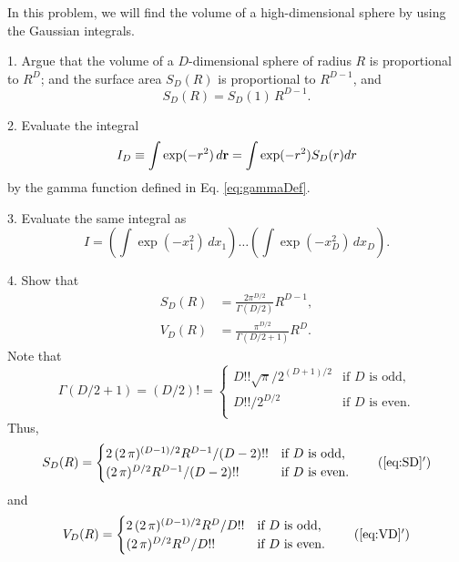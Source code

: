 \documentclass[12pt]{book}
\begin{document}



In this problem, we will find the volume of a high-dimensional sphere
by using the Gaussian integrals.

1. Argue that the volume of a $D$-dimensional sphere of radius $R$ is proportional to
$R^D$; and the surface area $S_D(R)$ is proportional to $R^{D-1}$, and
\[
  S_D(R) = S_D(1) \, R^{D-1}.
\]

2. Evaluate the integral
\[
  I_D \equiv \int \exp(-r^2) \, d\boldsymbol{\mathbf{r}} = \int \exp(-r^2) S_D(r) dr
\]
by the gamma function defined in Eq. \eqref{eq:gammaDef}.

3. Evaluate the same integral as
\[
  I
  =
\left( \int \exp(-x_1^2) \, d x_1 \right)
\dots
\left( \int \exp(-x_D^2) \, d x_D \right).
\]

4. Show that
\begin{align}
  S_D(R) &= \frac{ 2 \pi^{D/2} } { \Gamma(D/2) } R^{D-1},
  \label{eq:SD} \\
  V_D(R) &= \frac { \pi^{D/2} } { \Gamma(D/2+1) } R^D.
  \label{eq:VD}
\end{align}
Note that
\begin{equation}
  \Gamma\left( D/2 + 1 \right)
= \left( D/2 \right)!
=
\begin{cases}
  D!! \sqrt{\pi} / 2^{(D+1)/2}  & \mbox{if $D$ is odd,} \\
  D!! / 2^{D/2}                 & \mbox{if $D$ is even.} \\
\end{cases}
\end{equation}
Thus,
\begin{align}
  S_D(R)
=
\begin{cases}
  2 \, (2 \, \pi)^{(D-1)/2} R^{D-1} / (D-2)!!  & \mbox{if $D$ is odd,} \\
       (2 \, \pi)^{D/2} R^{D-1} / (D-2)!!      & \mbox{if $D$ is even.} \\
\end{cases}
\tag{\ref{eq:SD}$'$}
\label{eq:SDoe}
\end{align}
and
\begin{align}
  V_D(R)
=
\begin{cases}
  2 \, (2 \, \pi)^{(D-1)/2} R^D / D!!  & \mbox{if $D$ is odd,} \\
       (2 \, \pi)^{D/2} R^D / D!!      & \mbox{if $D$ is even.} \\
\end{cases}
\tag{\ref{eq:VD}$'$}
\label{eq:VDoe}
\end{align}
\end{document}
